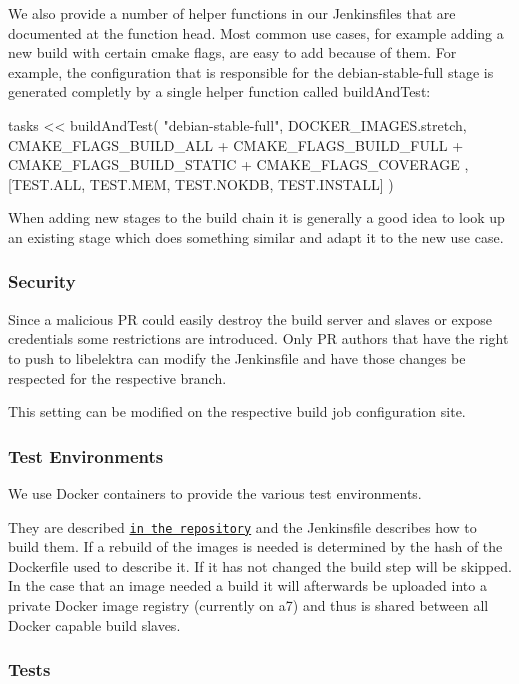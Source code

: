 We also provide a number of helper functions in our Jenkinsfiles that are documented at the function head. Most common use cases, for example adding a new build with certain cmake flags, are easy to add because of them. For example, the configuration that is responsible for the {\ttfamily debian-\/stable-\/full} stage is generated completly by a single helper function called {\ttfamily build\+And\+Test}\+:


\begin{DoxyCode}
tasks << buildAndTest(
  "debian-stable-full",
  DOCKER\_IMAGES.stretch,
  CMAKE\_FLAGS\_BUILD\_ALL +
    CMAKE\_FLAGS\_BUILD\_FULL +
    CMAKE\_FLAGS\_BUILD\_STATIC +
    CMAKE\_FLAGS\_COVERAGE
  ,
  [TEST.ALL, TEST.MEM, TEST.NOKDB, TEST.INSTALL]
)
\end{DoxyCode}


When adding new stages to the build chain it is generally a good idea to look up an existing stage which does something similar and adapt it to the new use case.

\subsubsection*{Security}

Since a malicious PR could easily destroy the build server and slaves or expose credentials some restrictions are introduced. Only PR authors that have the right to push to libelektra can modify the Jenkinsfile and have those changes be respected for the respective branch.

This setting can be modified on the respective build job configuration site.

\subsubsection*{Test Environments}

We use Docker containers to provide the various test environments.

They are described \href{https://master.libelektra.org/scripts/docker}{\tt in the repository} and the Jenkinsfile describes how to build them. If a rebuild of the images is needed is determined by the hash of the Dockerfile used to describe it. If it has not changed the build step will be skipped. In the case that an image needed a build it will afterwards be uploaded into a private Docker image registry (currently on a7) and thus is shared between all Docker capable build slaves.

\subsubsection*{Tests}


